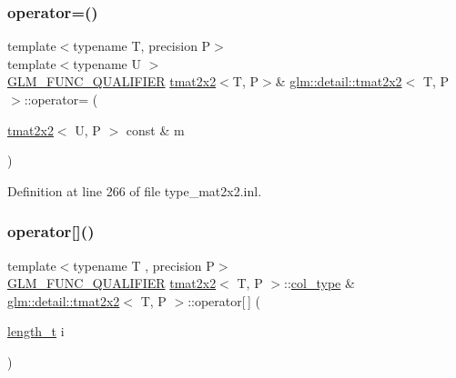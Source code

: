 \mbox{\label{structglm_1_1detail_1_1tmat2x2_a08aa9a6143024b1c562f717273dbec95}} 
\subsubsection{\texorpdfstring{operator=()}{operator=()}\hspace{0.1cm}{\footnotesize\ttfamily [3/3]}}
{\footnotesize\ttfamily template$<$typename T, precision P$>$ \\
template$<$typename U $>$ \\
\hyperlink{setup_8hpp_a33fdea6f91c5f834105f7415e2a64407}{G\+L\+M\+\_\+\+F\+U\+N\+C\+\_\+\+Q\+U\+A\+L\+I\+F\+I\+ER} \hyperlink{structglm_1_1detail_1_1tmat2x2}{tmat2x2}$<$T, P$>$\& \hyperlink{structglm_1_1detail_1_1tmat2x2}{glm\+::detail\+::tmat2x2}$<$ T, P $>$\+::operator= (\begin{DoxyParamCaption}\item[{\hyperlink{structglm_1_1detail_1_1tmat2x2}{tmat2x2}$<$ U, P $>$ const \&}]{m }\end{DoxyParamCaption})}



Definition at line 266 of file type\+\_\+mat2x2.\+inl.

\mbox{\label{structglm_1_1detail_1_1tmat2x2_a3eccfee40595e7b8023755e5d41ed0fe}} 
\subsubsection{\texorpdfstring{operator[]()}{operator[]()}\hspace{0.1cm}{\footnotesize\ttfamily [1/2]}}
{\footnotesize\ttfamily template$<$typename T , precision P$>$ \\
\hyperlink{setup_8hpp_a33fdea6f91c5f834105f7415e2a64407}{G\+L\+M\+\_\+\+F\+U\+N\+C\+\_\+\+Q\+U\+A\+L\+I\+F\+I\+ER} \hyperlink{structglm_1_1detail_1_1tmat2x2}{tmat2x2}$<$ T, P $>$\+::\hyperlink{structglm_1_1detail_1_1tmat2x2_ae8c6de6197aa1b65adf15c40197c04d1}{col\+\_\+type} \& \hyperlink{structglm_1_1detail_1_1tmat2x2}{glm\+::detail\+::tmat2x2}$<$ T, P $>$\+::operator\mbox{[}$\,$\mbox{]} (\begin{DoxyParamCaption}\item[{\hyperlink{namespaceglm_a090a0de2260835bee80e71a702492ed9}{length\+\_\+t}}]{i }\end{DoxyParamCaption})}




